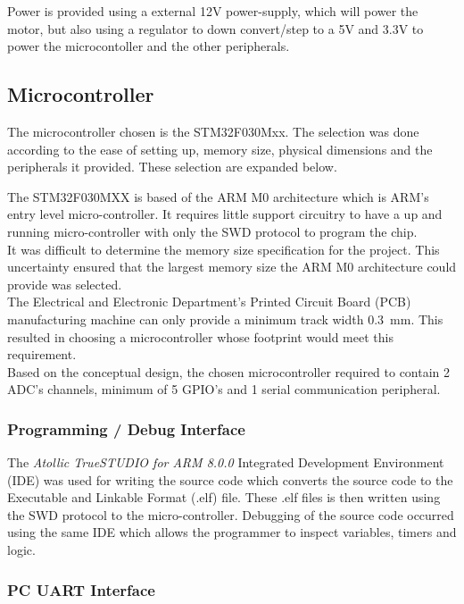 Power is provided using a external 12V power-supply, which will power the motor, but also using a regulator to down convert/step to a 5V and 3.3V to power the microcontoller and the other peripherals.


\subsection{Microcontroller}
The microcontroller chosen is the STM32F030Mxx. The selection was done according to the ease of setting up, memory size, physical dimensions and the peripherals it provided. These selection are expanded below.

The STM32F030MXX is based of the ARM M0 architecture which is ARM's entry level micro-controller. It requires little support circuitry to have a up and running micro-controller with only the SWD protocol to program the chip.\\

It was difficult to determine the memory size specification for the project. This uncertainty ensured that the largest memory size the ARM M0 architecture could provide was selected.\\

The Electrical and Electronic Department's Printed Circuit Board (PCB) manufacturing machine can only provide a  minimum track width \SI{0.3}{mm}. This resulted in choosing a microcontroller whose footprint would meet this requirement.\\

Based on the conceptual design, the chosen microcontroller required to contain 2 ADC's channels, minimum of 5 GPIO's and 1 serial communication peripheral. 

\subsubsection{Programming / Debug Interface}
The \textit{Atollic TrueSTUDIO for ARM 8.0.0} Integrated Development Environment (IDE) was used for writing the source code which converts the source code to the Executable and Linkable Format (.elf) file. These .elf files is then written using the SWD protocol to the micro-controller. Debugging of the source code occurred using the same IDE which allows the programmer to inspect variables, timers and logic.

\subsubsection{PC UART Interface }

